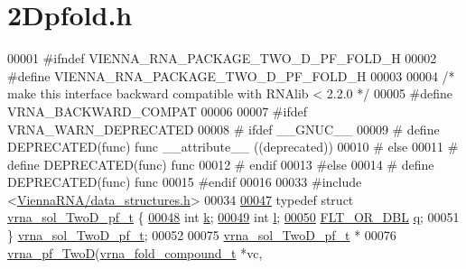 \hypertarget{2Dpfold_8h_source}{}\section{2\+Dpfold.h}
\label{2Dpfold_8h_source}

\begin{DoxyCode}
00001 \textcolor{preprocessor}{#ifndef VIENNA\_RNA\_PACKAGE\_TWO\_D\_PF\_FOLD\_H}
00002 \textcolor{preprocessor}{#define VIENNA\_RNA\_PACKAGE\_TWO\_D\_PF\_FOLD\_H}
00003 
00004 \textcolor{comment}{/* make this interface backward compatible with RNAlib < 2.2.0 */}
00005 \textcolor{preprocessor}{#define VRNA\_BACKWARD\_COMPAT}
00006 
00007 \textcolor{preprocessor}{#ifdef VRNA\_WARN\_DEPRECATED}
00008 \textcolor{preprocessor}{# ifdef \_\_GNUC\_\_}
00009 \textcolor{preprocessor}{#  define DEPRECATED(func) func \_\_attribute\_\_ ((deprecated))}
00010 \textcolor{preprocessor}{# else}
00011 \textcolor{preprocessor}{#  define DEPRECATED(func) func}
00012 \textcolor{preprocessor}{# endif}
00013 \textcolor{preprocessor}{#else}
00014 \textcolor{preprocessor}{# define DEPRECATED(func) func}
00015 \textcolor{preprocessor}{#endif}
00016 
00033 \textcolor{preprocessor}{#include <\hyperlink{data__structures_8h}{ViennaRNA/data\_structures.h}>}
00034 
\hyperlink{group__kl__neighborhood__pf}{00047} \textcolor{keyword}{typedef} \textcolor{keyword}{struct }\hyperlink{group__kl__neighborhood__pf_structvrna__sol__TwoD__pf__t}{vrna\_sol\_TwoD\_pf\_t} \{
\hyperlink{group__kl__neighborhood__pf_ad1f23b46dc4ebd373abdeb0382d87b83}{00048}   \textcolor{keywordtype}{int}         \hyperlink{group__kl__neighborhood__pf_ad1f23b46dc4ebd373abdeb0382d87b83}{k};  
\hyperlink{group__kl__neighborhood__pf_a01133c264eff2c988d144e07803d1b8b}{00049}   \textcolor{keywordtype}{int}         \hyperlink{group__kl__neighborhood__pf_a01133c264eff2c988d144e07803d1b8b}{l};  
\hyperlink{group__kl__neighborhood__pf_a17ebbf425b8769ded74b5c7b85e58ee1}{00050}   \hyperlink{group__data__structures_ga31125aeace516926bf7f251f759b6126}{FLT\_OR\_DBL}  \hyperlink{group__kl__neighborhood__pf_a17ebbf425b8769ded74b5c7b85e58ee1}{q};  
00051 \} \hyperlink{group__kl__neighborhood__pf_ga5e449fbd695406aabd2bcabddc374621}{vrna\_sol\_TwoD\_pf\_t};
00052 
00075 \hyperlink{group__kl__neighborhood__pf_structvrna__sol__TwoD__pf__t}{vrna\_sol\_TwoD\_pf\_t} *
00076 \hyperlink{group__kl__neighborhood__pf_ga0bc3427689bd09da09b8b3094a27f836}{vrna\_pf\_TwoD}(\hyperlink{group__fold__compound_structvrna__fc__s}{vrna\_fold\_compound\_t} *vc,

\end{DoxyCode}
